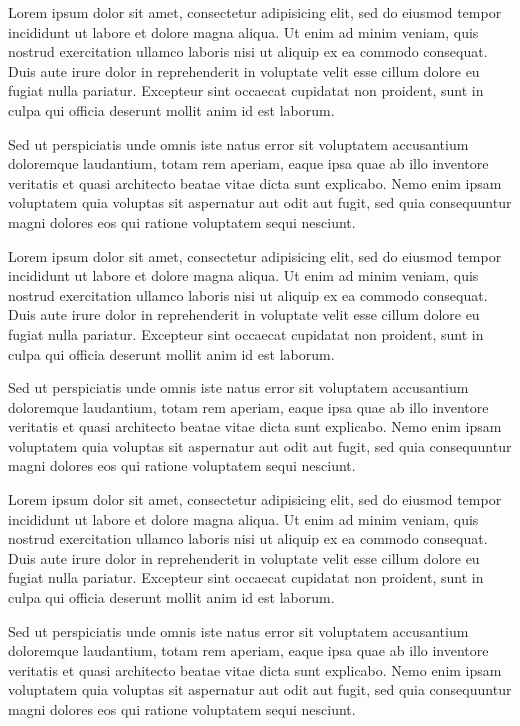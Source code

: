 %

Lorem ipsum dolor sit amet, consectetur adipisicing elit, sed do eiusmod 
tempor incididunt ut labore et dolore magna aliqua. Ut enim ad minim veniam, 
quis nostrud exercitation ullamco laboris nisi ut aliquip ex ea commodo 
consequat. Duis aute irure dolor in reprehenderit in voluptate velit esse 
cillum dolore eu fugiat nulla pariatur. Excepteur sint occaecat cupidatat 
non proident, sunt in culpa qui officia deserunt mollit anim id est laborum.

Sed ut perspiciatis unde omnis iste natus error sit voluptatem accusantium 
doloremque laudantium, totam rem aperiam, eaque ipsa quae ab illo inventore 
veritatis et quasi architecto beatae vitae dicta sunt explicabo. Nemo enim 
ipsam voluptatem quia voluptas sit aspernatur aut odit aut fugit, sed quia 
consequuntur magni dolores eos qui ratione voluptatem sequi nesciunt.

Lorem ipsum dolor sit amet, consectetur adipisicing elit, sed do eiusmod 
tempor incididunt ut labore et dolore magna aliqua. Ut enim ad minim veniam, 
quis nostrud exercitation ullamco laboris nisi ut aliquip ex ea commodo 
consequat. Duis aute irure dolor in reprehenderit in voluptate velit esse 
cillum dolore eu fugiat nulla pariatur. Excepteur sint occaecat cupidatat 
non proident, sunt in culpa qui officia deserunt mollit anim id est laborum.

Sed ut perspiciatis unde omnis iste natus error sit voluptatem accusantium 
doloremque laudantium, totam rem aperiam, eaque ipsa quae ab illo inventore 
veritatis et quasi architecto beatae vitae dicta sunt explicabo. Nemo enim 
ipsam voluptatem quia voluptas sit aspernatur aut odit aut fugit, sed quia 
consequuntur magni dolores eos qui ratione voluptatem sequi nesciunt.

Lorem ipsum dolor sit amet, consectetur adipisicing elit, sed do eiusmod 
tempor incididunt ut labore et dolore magna aliqua. Ut enim ad minim veniam, 
quis nostrud exercitation ullamco laboris nisi ut aliquip ex ea commodo 
consequat. Duis aute irure dolor in reprehenderit in voluptate velit esse 
cillum dolore eu fugiat nulla pariatur. Excepteur sint occaecat cupidatat 
non proident, sunt in culpa qui officia deserunt mollit anim id est laborum.

Sed ut perspiciatis unde omnis iste natus error sit voluptatem accusantium 
doloremque laudantium, totam rem aperiam, eaque ipsa quae ab illo inventore 
veritatis et quasi architecto beatae vitae dicta sunt explicabo. Nemo enim 
ipsam voluptatem quia voluptas sit aspernatur aut odit aut fugit, sed quia 
consequuntur magni dolores eos qui ratione voluptatem sequi nesciunt.

